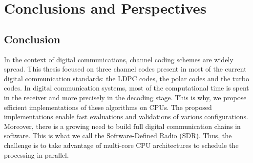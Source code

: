 
\graphicspath{{main/conclusion/fig/}}

\chapter*{Conclusions and Perspectives}

\section*{Conclusion}

In the context of digital communications, channel coding schemes are widely
spread. This thesis focused on three channel codes present in most of the
current digital communication standards: the LDPC codes, the polar codes and the
turbo codes. In digital communication systems, most of the computational
time is spent in the receiver and more precisely in the decoding stage. This is
why, we propose efficient implementations of these algorithms on CPUs. The
proposed implementations enable fast evaluations and validations of various
configurations. Moreover, there is a growing need to build full digital
communication chains in software. This is what we call the Software-Defined
Radio (SDR). Thus, the challenge is to take advantage of multi-core CPU
architectures to schedule the processing in parallel.

